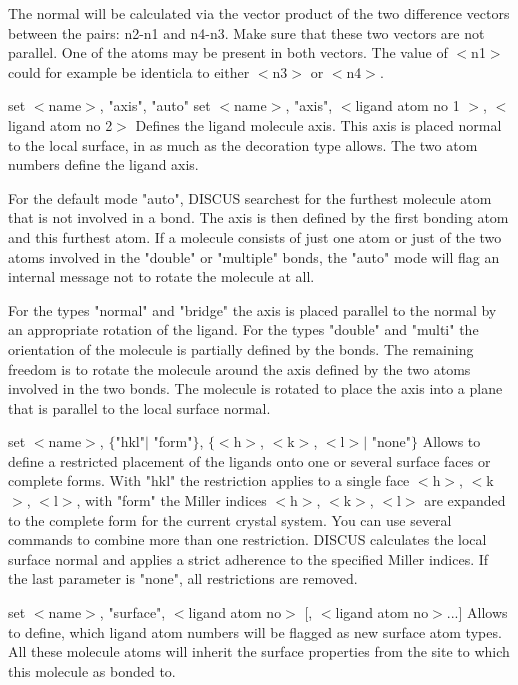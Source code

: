     The normal will be calculated via the vector product of the 
    two difference vectors between the pairs: n2-n1  and n4-n3. Make sure 
    that these two vectors are not parallel. One of the atoms may 
    be present in both vectors. The value of $ <$n1$> $ could for example be 
    identicla to either $ <$n3$> $ or $ <$n4$> $. 
\par
set $ <$name$> $, "axis", "auto" 
set $ <$name$> $, "axis", $ <$ligand atom no 1 $> $, $ <$ligand atom no 2$> $ 
    Defines the ligand molecule axis. This axis is placed normal to the local 
    surface, in as much as the decoration type allows. 
    The two atom numbers define the ligand axis. 
\par
    For the default mode "auto", DISCUS searchest for the furthest molecule 
    atom that is not involved in a bond. The axis is then defined by 
    the first bonding atom and this furthest atom. 
    If a molecule consists of just one atom or just of the two atoms 
    involved in the "double" or "multiple" bonds, the "auto" mode will 
    flag an internal message not to rotate the molecule at all. 
\par
    For the types "normal" and "bridge" the axis is placed parallel to the 
    normal by an appropriate rotation of the ligand. 
    For the types "double" and "multi" the orientation of the molecule is 
    partially defined by the bonds. The remaining freedom is to rotate 
    the molecule around the axis defined by the two atoms involved in the 
    two bonds. The molecule is rotated to place the axis into a 
    plane that is parallel to the local surface normal. 
\par
set $ <$name$> $, $ \{$"hkl"$| $ "form"$\} $, $ \{$$ <$h$> $, $ <$k$> $, $ <$l$> $$| $ "none"$\} $ 
    Allows to define a restricted placement of the ligands onto one or 
    several surface faces or complete forms. 
    With "hkl" the restriction applies to a single face $ <$h$> $, $ <$k$> $, $ <$l$> $, 
    with "form" the Miller indices $ <$h$> $, $ <$k$> $, $ <$l$> $ are expanded to the 
    complete form for the current crystal system. 
    You can use several commands to combine more than one restriction. 
    DISCUS calculates the local surface normal and applies a strict 
    adherence to the specified Miller indices. 
    If the last parameter is "none", all restrictions are removed. 
\par
set $ <$name$> $, "surface", $ <$ligand atom no$> $ [, $ <$ligand atom no$> $...] 
    Allows to define, which ligand atom numbers will be flagged as 
    new surface atom types. All these molecule atoms will inherit the 
    surface properties from the site to which this molecule as bonded 
    to. 
